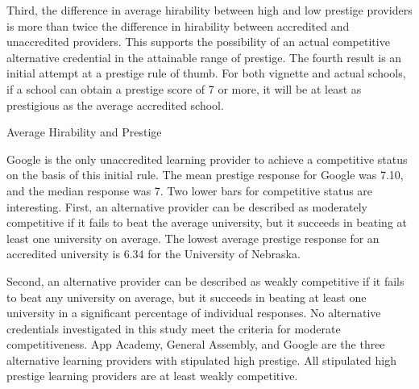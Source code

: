 \documentclass[review]{elsarticle}
\begin{document}
Third, the difference in average hirability between high and low prestige providers
is more than twice the difference in hirability between accredited and unaccredited providers.
This supports the possibility of an actual competitive alternative credential in the attainable range of prestige.
The fourth result is an initial attempt at a prestige rule of thumb.
For both vignette and actual schools,
if a school can obtain a prestige score of 7 or more,
it will be at least as prestigious as the average accredited school.

\begin{table}
    \caption{Average Hirability and Prestige}
    \resizebox{\columnwidth}{!}{
        
    }
    \label{tab:desc_stats}
\end{table}


Google is the only unaccredited learning provider to achieve a competitive status on the basis of this initial rule.
The mean prestige response for Google was 7.10, and the median response was 7.
Two lower bars for competitive status are interesting.
First, an alternative provider can be described as moderately competitive if it fails to beat the average university,
but it succeeds in beating at least one university on average.
The lowest average prestige response for an accredited university is 6.34 for the University of Nebraska.

Second, an alternative provider can be described as weakly competitive if it fails to beat any university on average,
but it succeeds in beating at least one university in a significant percentage of individual responses.
No alternative credentials investigated in this study meet the criteria for moderate competitiveness.
App Academy, General Assembly, and Google are the three alternative learning providers with stipulated high prestige.
All stipulated high prestige learning providers are at least weakly competitive.
\end{document}
